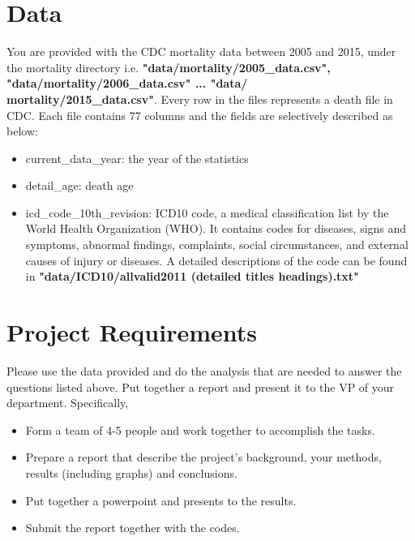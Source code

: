 \documentclass{article}
\begin{document}
\section{Data} %
You are provided with the CDC mortality data between 2005 and 2015, under the mortality directory i.e. \textbf{"data\//mortality\//2005\_data.csv", "data\//mortality\//2006\_data.csv" ... "data/\\mortality\//2015\_data.csv"}. Every row in the files represents a death file in CDC. Each file contains 77 columns and the fields are selectively described as below:
\begin{itemize}
\item current\_data\_year: the year of the statistics
\item detail\_age: death age
\item icd\_code\_10th\_revision: ICD10 code, a medical classification list by the World Health Organization (WHO). It contains codes for diseases, signs and symptoms, abnormal findings, complaints, social circumstances, and external causes of injury or diseases. A detailed descriptions of the code can be found in \textbf{"data\//ICD10\//allvalid2011 (detailed titles headings).txt"}
\end{itemize}

\section{Project Requirements}
Please use the data provided and do the analysis that are needed to answer the questions listed above. Put together a report and present it to the VP of your department. Specifically, 
\begin{itemize}
\item Form a team of 4-5 people and work together to accomplish the tasks.
\item Prepare a report that describe the project's background, your methods, results (including graphs) and conclusions.
\item Put together a powerpoint and presents to the results.
\item Submit the report together with the codes.
\end{itemize}
\end{document}
